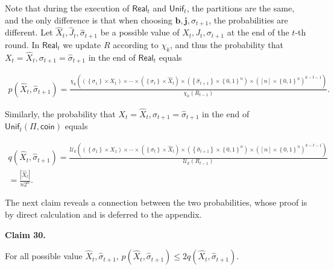 \documentclass[10pt,a4paper]{article}
\begin{document}
Note that during the execution of $\mathsf{Real}_{t}$ and $\mathsf{Unif}_{t}$, the partitions are the same, and the only difference is that when choosing $\bm{b,j},\sigma_{t+1}$, the probabilities are different.
Let $\widehat{X}_{t},\widehat{J}_{t},\widehat{\sigma}_{t+1}$ be a possible value of $X_{t},J_{t},\sigma_{t+1}$ at the end of the $t$-th round.
In $\mathsf{Real}_{t}$ we update $R$ according to $\chi_{k}$,
and thus the probability that $X_{t}=\widehat{X}_{t},\sigma_{t+1}=\widehat{\sigma}_{t+1}$ in the end of $\mathsf{Real}_{t}$ equals\par


\[\begin{gathered}
p(\widehat{X}_{t},\widehat{\sigma}_{t+1})=\frac{\chi_{k}((\left\{\sigma_{1}\right\}\times X_{1})\times\cdots\times(\left\{\sigma_{t}\right\}\times\widehat{X}_{t})\times(\left\{\widehat{\sigma}_{t+1}\right\}\times\left\{0,1\right\}^{n})\times([n]\times\left\{0,1\right\}^{n})^{k-t-1})}{\chi_{k}(R_{t-1})}.
\end{gathered}\]


Similarly, the probability that $X_{t}=\widehat{X}_{t},\sigma_{t+1}=\widehat{\sigma}_{t+1}$ in the end of $\mathsf{Unif}_{t}(\Pi,\mathsf{coin})$ equals\par


\[\begin{gathered}
\displaystyle q(\widehat{X}_{t},\widehat{\sigma}_{t+1})= \displaystyle\frac{\mathcal{U}_{k}((\left\{\sigma_{1}\right\}\times X_{1})\times\cdots\times(\left\{\sigma_{t}\right\}\times\widehat{X}_{t})\times(\left\{\widehat{\sigma}_{t+1}\right\}\times\left\{0,1\right\}^{n})\times([n]\times\left\{0,1\right\}^{n})^{k-t-1})}{\mathcal{U}_{k}(R_{t-1})} \\
\displaystyle= \displaystyle\frac{|\widehat{X}_{t}|}{n2^{n}}.
\end{gathered}\]


The next claim reveals a connection between the two probabilities,
whose proof is by direct calculation and is deferred to the appendix.\par





\par\medskip\noindent\textbf{
Claim 30. 
}\par



For all possible value $\widehat{X}_{t},\widehat{\sigma}_{t+1}$, $p(\widehat{X}_{t},\widehat{\sigma}_{t+1})\leq 2q(\widehat{X}_{t},\widehat{\sigma}_{t+1})$.\par
\end{document}
